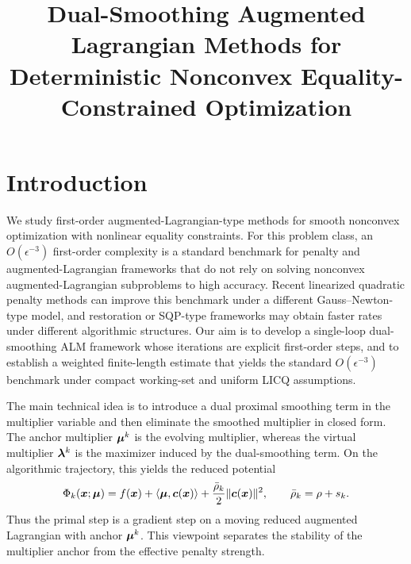 \documentclass[10pt]{article}
\title{Dual-Smoothing Augmented Lagrangian Methods for Deterministic Nonconvex Equality-Constrained Optimization}
\author{}
\begin{document}
\maketitle

\section{Introduction}
\label{sec:introduction}

We study first-order augmented-Lagrangian-type methods for smooth nonconvex
optimization with nonlinear equality constraints.  For this problem class,
an $O(\epsilon^{-3})$ first-order complexity is a standard benchmark for
penalty and augmented-Lagrangian frameworks that do not rely on solving
nonconvex augmented-Lagrangian subproblems to high accuracy.  Recent
linearized quadratic penalty methods can improve this benchmark under a
different Gauss--Newton-type model, and restoration or SQP-type frameworks
may obtain faster rates under different algorithmic structures.  Our aim is
to develop a single-loop dual-smoothing ALM framework whose iterations are
explicit first-order steps, and to establish a weighted finite-length
estimate that yields the standard $O(\epsilon^{-3})$ benchmark under compact
working-set and uniform LICQ assumptions.

The main technical idea is to introduce a dual proximal smoothing term in
the multiplier variable and then eliminate the smoothed multiplier in closed
form.  The anchor multiplier $\bm{\mu}^k$ is the evolving multiplier, whereas the
virtual multiplier $\bm{\lambda}^k$ is the maximizer induced by the dual-smoothing
term.  On the algorithmic trajectory, this yields the reduced potential
\[
    \Phi_k(\bm{x};\bm{\mu})
    =
    f(\bm{x})
    +
    \langle \bm{\mu},\bm{c}(\bm{x})\rangle
    +
    \frac{\bar\rho_k}{2}\|\bm{c}(\bm{x})\|^2,
    \qquad
    \bar\rho_k=\rho+s_k .
\]
Thus the primal step is a gradient step on a moving reduced augmented
Lagrangian with anchor $\bm{\mu}^k$.  This viewpoint separates the stability of
the multiplier anchor from the effective penalty strength.
\end{document}
